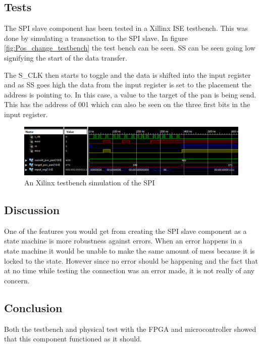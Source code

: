 \subsection{Tests}

The SPI slave component has been tested in a Xillinx ISE testbench. This was done by simulating a transaction to the SPI slave. In figure \ref{fig:Pos_change_testbench} the test bench can be seen. SS can be seen going low signifying the start of the data transfer.

The S\_CLK then starts to toggle and the data is shifted into the input register and as SS goes high the data from the input register is set to the placement the address is pointing to. In this case, a value to the target of the pan is being send. This has the address of 001 which can also be seen on the three first bits in the input register.

\begin{figure}[h!]
\centering
\includegraphics[scale=0.5]{Billeder/FPGA/SPI_Slave/Testbench_of_SPI.png}
\caption{ An Xilinx testbench simulation of the SPI }
\label{fig:Testbench_of_SPI}
\end{figure}

\subsection{Discussion}

One of the features you would get from creating the SPI slave component as a state machine is more robustness against errors. When an error happens in a state machine it would be unable to make the same amount of mess because it is locked to the state. However since no error should be happening and the fact that at no time while testing the connection was an error made, it is not really of any concern.

\subsection{Conclusion}

Both the testbench and physical test with the FPGA and microcontroller showed that this component functioned as it should.